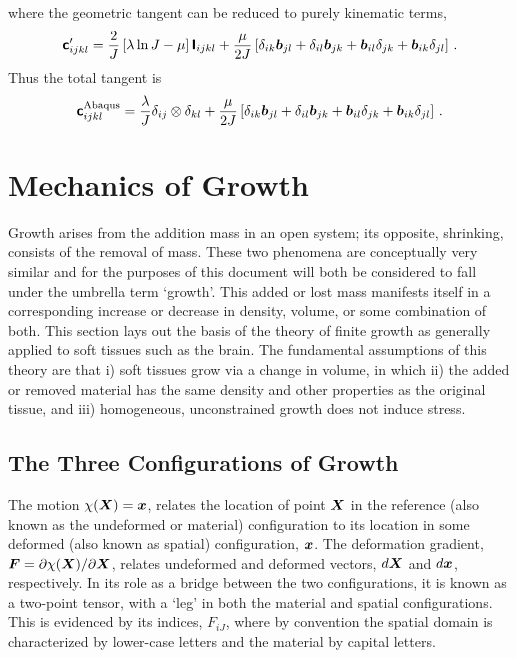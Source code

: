 \documentclass[10pt,letterpaper,oneside]{report}
\newcommand{\ten}[1]{\mbox{\boldmath $#1$}{}}
\newcommand{\tenf}[1]{\mbox{{\sffamily{\bfseries {#1}}}}}
\newcommand{\scas}[1]{\mbox{{\scriptsize{${\rm{#1}}$}}}{}}
\begin{document}
where the geometric tangent can be reduced to purely kinematic terms, 
\begin{equation}
\tenf{c}'_{ijkl} = \frac{2}{J} \left[ \lambda \ln J - \mu \right] \tenf{I}_{ijkl} + \frac{\mu}{2 J} \left[ \delta_{ik} \ten{b}_{jl} + \delta_{il} \ten{b}_{jk} + \ten{b}_{il} \delta_{jk} + \ten{b}_{ik} \delta_{jl} \right] \, . 
\end{equation}
Thus the total tangent is
\begin{equation}
\tenf{c}^{\scas{Abaqus}}_{ijkl} = \frac{\lambda}{J} \delta_{ij} \otimes \delta_{kl} + \frac{\mu}{2 J} \left[ \delta_{ik} \ten{b}_{jl} + \delta_{il} \ten{b}_{jk} + \ten{b}_{il} \delta_{jk} + \ten{b}_{ik} \delta_{jl} \right] \, . 
\end{equation}



\chapter{Mechanics of Growth}
\label{chap:mechofgrowth}
Growth arises from the addition mass in an open system; its opposite, shrinking, consists of the removal of mass.  These two phenomena are conceptually very similar and for the purposes of this document will both be considered to fall under the umbrella term `growth'.  This added or lost mass manifests itself in a corresponding increase or decrease in density, volume, or some combination of both.  
This section lays out the basis of the theory of finite growth as generally applied to soft tissues such as the brain.  The fundamental assumptions of this theory are that i) soft tissues grow via a change in volume, in which ii) the added or removed material has the same density and other properties as the original tissue, and iii) homogeneous, unconstrained growth does not induce stress.

\section{The Three Configurations of Growth}

The motion $\chi ( \ten{X} ) = \ten{x}$, relates the location of point $\ten{X}$ in the reference (also known as the undeformed or material) configuration to its location in some deformed (also known as spatial) configuration, $\ten{x}$.  The deformation gradient, $\ten{F} = \partial \chi ( \ten{X} ) / \partial \ten{X}$, relates undeformed and deformed vectors, $d \ten{X}$ and $d \ten{x}$, respectively.  In its role as a bridge between the two configurations, it is known as a two-point tensor, with a `leg' in both the material and spatial configurations.  This is evidenced by its indices, $F_{iJ}$, where by convention the spatial domain is characterized by lower-case letters and the material by capital letters.
\end{document}
